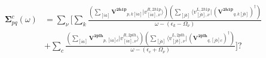 \begin{align}
\bm\Sigma^c_{pq}(\omega)&=\sum_\nu \biggl[
    \sum_k\frac{\left(\sum_{[ia]}\bm{V^{2h1p}}_{p,k[ia]}|v_{[ia],\nu}^{R,2h1p}\rangle\right) \left(\sum_{[jb]} \langle v_{[jb],\nu}^{L,2h1p}|\,(\bm{V^{2h1p}}_{q,k[jb]})^\dagger\right)}
         {\omega - (\epsilon_k - \Omega_\nu)}\\
  &+ \sum_c\frac{\left(\sum_{[ia]}\bm{V^{2plh}}_{p,[ia]c}|v_{[ia],\nu}^{R,2plh}\rangle\right) \left(\sum_{[jb]} \langle v_{[jb],\nu}^{L,2plh}|\,(\bm{V^{2plh}}_{q,[jb]c})^\dagger\right)}
         {\omega - (\epsilon_c + \Omega_\nu)} \biggr]?
\end{align}

